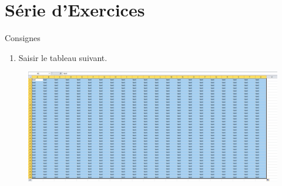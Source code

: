 \section{Série d'Exercices}
\begin{exercice}\label{ex4}
	Consignes 
	\begin{enumerate}		
		\item  Saisir  le tableau suivant.
	\end{enumerate}
\end{exercice} 
\begin{figure}[H]  
	\centering
	\includegraphics[scale=0.2,width= \linewidth]{img/ex04} 
\end{figure} 

